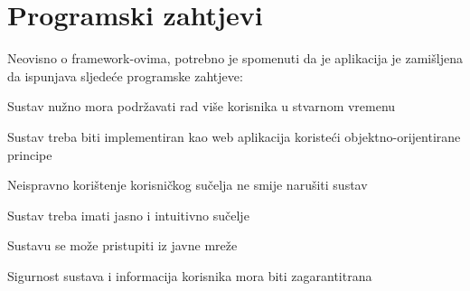 	\bigskip

	\section{Programski zahtjevi}
	Neovisno o framework-ovima, potrebno je spomenuti da je aplikacija je zamišljena da ispunjava sljedeće programske zahtjeve:

		\begin{packed_item}

			\item Sustav nužno mora podržavati rad više korisnika u stvarnom vremenu
			\item Sustav treba biti implementiran kao web aplikacija koristeći objektno-orijentirane principe
			\item Neispravno korištenje korisničkog sučelja ne smije narušiti sustav
			\item Sustav treba imati jasno i intuitivno sučelje
			\item Sustavu se može pristupiti iz javne mreže
			\item Sigurnost sustava i informacija korisnika mora biti zagarantitrana

		\end{packed_item}

